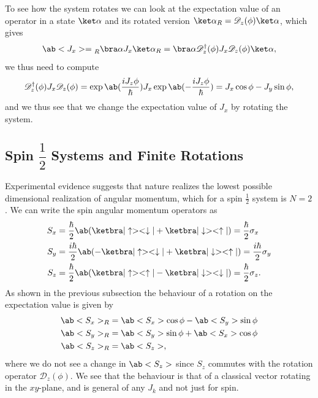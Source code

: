 To see how the system rotates we can look at the expectation value of an operator in a state $\ket\alpha$ and its rotated version $\ket\alpha_R = \mathscr{D}_z(\phi)\ket\alpha$, which gives
\begin{equation}
    \expval{J_x} = \prescript{}{R}{\bra\alpha}  J_x \ket\alpha_R = \bra\alpha \mathscr{D}_z^\dagger (\phi) J_x \mathscr{D}_z(\phi) \ket\alpha,
\end{equation}
we thus need to compute 
\begin{equation}
    \mathscr{D}_z^\dagger (\phi) J_x \mathscr{D}_z(\phi) = \exp\ab(\frac{i J_z \phi}{\hbar}) J_x \exp\ab(-\frac{i J_z \phi}{\hbar}) = J_x \cos\phi - J_y \sin\phi,
\end{equation}
and we thus see that we change the expectation value of $J_x$ by rotating the system.

\subsection{\texorpdfstring{Spin $\dfrac{1}{2}$ Systems and Finite Rotations}{Spin 1/2 Systems and Finite Rotations}}
Experimental evidence suggests that nature realizes the lowest possible dimensional realization of angular momentum, which for a spin $\frac{1}{2}$ system is $N=2$. We can write the spin angular momentum operators as
\begin{subequations}\begin{align}
    S_x &= \frac{\hbar}{2} \ab (\kb{\uparrow}{\downarrow} + \kb{\downarrow}{\uparrow}) = \frac{\hbar}{2}\sigma_x\\
    S_y &= \frac{i\hbar}{2} \ab (-\kb{\uparrow}{\downarrow} + \kb{\downarrow}{\uparrow}) = \frac{i\hbar}{2}\sigma_y\\
    S_z &= \frac{\hbar}{2} \ab (\kb{\uparrow}{\uparrow} - \kb{\downarrow}{\downarrow}) = \frac{\hbar}{2}\sigma_z.
\end{align}\end{subequations}
As shown in the previous subsection the behaviour of a rotation on the expectation value is given by
\begin{subequations}\label{eqs:SR}\begin{align}
    \expval{S_x}_R &= \expval{S_x}\cos\phi - \expval{S_y}\sin\phi\label{eq:SxR}\\
    \expval{S_y}_R &= \expval{S_y}\sin\phi + \expval{S_x}\cos\phi\label{eq:SyR}\\
    \expval{S_z}_R &= \expval{S_z}\label{eq:SzR},
\end{align}\end{subequations}
where we do not see a change in $\expval{S_z}$ since $S_z$ commutes with the rotation operator $\mathscr{D}_z(\phi)$. We see that the behaviour is that of a classical vector rotating in the $xy$-plane, and is general of any $J_k$ and not just for spin.

